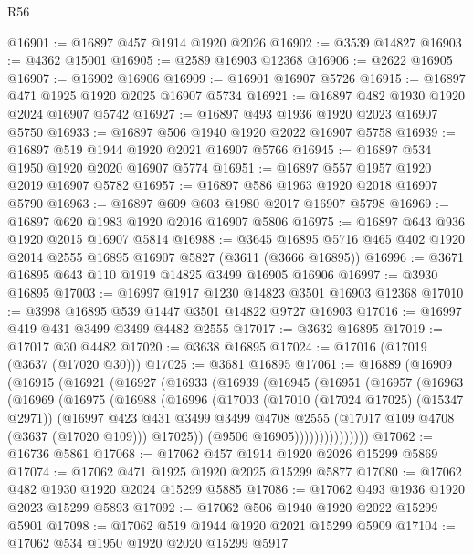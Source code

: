 \begin{lexlean}{R56}
\begin{coremodule}
@16901 := @16897 @457 @1914 @1920 @2026
@16902 := @3539 @14827
@16903 := @4362 @15001
@16905 := @2589 @16903 @12368
@16906 := @2622 @16905
@16907 := @16902 @16906
@16909 := @16901 @16907 @5726
@16915 := @16897 @471 @1925 @1920 @2025 @16907 @5734
@16921 := @16897 @482 @1930 @1920 @2024 @16907 @5742
@16927 := @16897 @493 @1936 @1920 @2023 @16907 @5750
@16933 := @16897 @506 @1940 @1920 @2022 @16907 @5758
@16939 := @16897 @519 @1944 @1920 @2021 @16907 @5766
@16945 := @16897 @534 @1950 @1920 @2020 @16907 @5774
@16951 := @16897 @557 @1957 @1920 @2019 @16907 @5782
@16957 := @16897 @586 @1963 @1920 @2018 @16907 @5790
@16963 := @16897 @609 @603 @1980 @2017 @16907 @5798
@16969 := @16897 @620 @1983 @1920 @2016 @16907 @5806
@16975 := @16897 @643 @936 @1920 @2015 @16907 @5814
@16988 := @3645 @16895 @5716 @465 @402 @1920 @2014 @2555 @16895 @16907 @5827 (@3611 (@3666 @16895))
@16996 := @3671 @16895 @643 @110 @1919 @14825 @3499 @16905 @16906
@16997 := @3930 @16895
@17003 := @16997 @1917 @1230 @14823 @3501 @16903 @12368
@17010 := @3998 @16895 @539 @1447 @3501 @14822 @9727 @16903
@17016 := @16997 @419 @431 @3499 @3499 @4482 @2555
@17017 := @3632 @16895
@17019 := @17017 @30 @4482
@17020 := @3638 @16895
@17024 := @17016 (@17019 (@3637 (@17020 @30)))
@17025 := @3681 @16895
@17061 := @16889
    (@16909
      (@16915
        (@16921
          (@16927
            (@16933
              (@16939
                (@16945
                  (@16951
                    (@16957
                      (@16963
                        (@16969
                          (@16975
                            (@16988
                              (@16996
                                (@17003
                                  (@17010 (@17024 @17025) (@15347 @2971))
                                  (@16997
                                    @423
                                    @431
                                    @3499
                                    @3499
                                    @4708
                                    @2555
                                    (@17017 @109 @4708 (@3637 (@17020 @109)))
                                    @17025))
                                (@9506 @16905)))))))))))))))
@17062 := @16736 @5861
@17068 := @17062 @457 @1914 @1920 @2026 @15299 @5869
@17074 := @17062 @471 @1925 @1920 @2025 @15299 @5877
@17080 := @17062 @482 @1930 @1920 @2024 @15299 @5885
@17086 := @17062 @493 @1936 @1920 @2023 @15299 @5893
@17092 := @17062 @506 @1940 @1920 @2022 @15299 @5901
@17098 := @17062 @519 @1944 @1920 @2021 @15299 @5909
@17104 := @17062 @534 @1950 @1920 @2020 @15299 @5917

\end{coremodule}
\end{lexlean}
